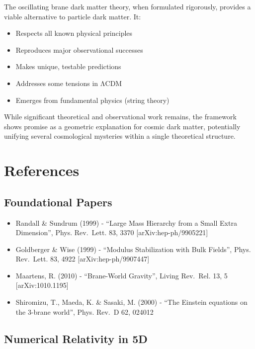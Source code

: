 \documentclass[
  11pt,
]{report}
\providecommand{\tightlist}{%
  \setlength{\itemsep}{0pt}\setlength{\parskip}{0pt}}
\begin{document}
The oscillating brane dark matter theory, when formulated rigorously,
provides a viable alternative to particle dark matter. It:

\begin{itemize}
\tightlist
\item
  Respects all known physical principles
\item
  Reproduces major observational successes
\item
  Makes unique, testable predictions
\item
  Addresses some tensions in ΛCDM
\item
  Emerges from fundamental physics (string theory)
\end{itemize}

While significant theoretical and observational work remains, the
framework shows promise as a geometric explanation for cosmic dark
matter, potentially unifying several cosmological mysteries within a
single theoretical structure.

\section{References}\label{references}

\subsection{Foundational Papers}\label{foundational-papers}

\begin{itemize}
\tightlist
\item
  Randall \& Sundrum (1999) - ``Large Mass Hierarchy from a Small Extra
  Dimension'', Phys. Rev.~Lett. 83, 3370 {[}arXiv:hep-ph/9905221{]}
\item
  Goldberger \& Wise (1999) - ``Modulus Stabilization with Bulk
  Fields'', Phys. Rev.~Lett. 83, 4922 {[}arXiv:hep-ph/9907447{]}
\item
  Maartens, R. (2010) - ``Brane-World Gravity'', Living Rev.~Rel. 13, 5
  {[}arXiv:1010.1195{]}
\item
  Shiromizu, T., Maeda, K. \& Sasaki, M. (2000) - ``The Einstein
  equations on the 3-brane world'', Phys. Rev.~D 62, 024012
\end{itemize}

\subsection{Numerical Relativity in
5D}\label{numerical-relativity-in-5d}
\end{document}
